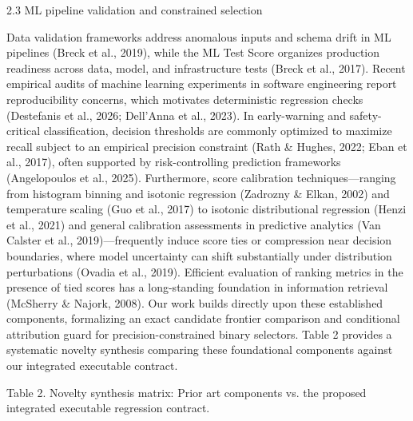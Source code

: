 \documentclass[11pt,a4paper]{article}
\begin{document}
2.3 ML pipeline validation and constrained selection

Data validation frameworks address anomalous inputs and schema drift in ML pipelines (Breck et al., 2019), while the ML Test Score organizes production readiness across data, model, and infrastructure tests (Breck et al., 2017). Recent empirical audits of machine learning experiments in software engineering report reproducibility concerns, which motivates deterministic regression checks (Destefanis et al., 2026; Dell'Anna et al., 2023). In early-warning and safety-critical classification, decision thresholds are commonly optimized to maximize recall subject to an empirical precision constraint (Rath \& Hughes, 2022; Eban et al., 2017), often supported by risk-controlling prediction frameworks (Angelopoulos et al., 2025). Furthermore, score calibration techniques---ranging from histogram binning and isotonic regression (Zadrozny \& Elkan, 2002) and temperature scaling (Guo et al., 2017) to isotonic distributional regression (Henzi et al., 2021) and general calibration assessments in predictive analytics (Van Calster et al., 2019)---frequently induce score ties or compression near decision boundaries, where model uncertainty can shift substantially under distribution perturbations (Ovadia et al., 2019). Efficient evaluation of ranking metrics in the presence of tied scores has a long-standing foundation in information retrieval (McSherry \& Najork, 2008). Our work builds directly upon these established components, formalizing an exact candidate frontier comparison and conditional attribution guard for precision-constrained binary selectors. Table 2 provides a systematic novelty synthesis comparing these foundational components against our integrated executable contract.

Table 2. Novelty synthesis matrix: Prior art components vs. the proposed integrated executable regression contract.
\end{document}
